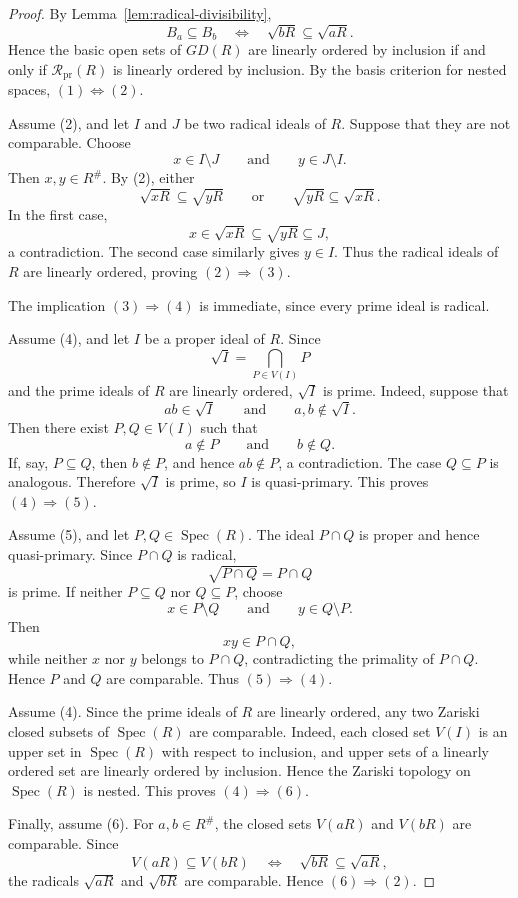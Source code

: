 \documentclass[11pt]{amsart}
\theoremstyle{plain}
\theoremstyle{definition}
\theoremstyle{remark}
\numberwithin{equation}{section}
\begin{document}
\begin{proof}
	By Lemma~\ref{lem:radical-divisibility},
	\[
	B_a\subseteq B_b
	\quad\Longleftrightarrow\quad
	\sqrt{bR}\subseteq\sqrt{aR}.
	\]
	Hence the basic open sets of $GD(R)$ are linearly ordered by inclusion
	if and only if $\mathcal R_{\mathrm{pr}}(R)$ is linearly ordered by
	inclusion. By the basis criterion for nested spaces,
	$(1)\Leftrightarrow(2)$.
	
	Assume (2), and let $I$ and $J$ be two radical ideals of $R$.
	Suppose that they are not comparable. Choose
	\[
	x\in I\setminus J
	\qquad\text{and}\qquad
	y\in J\setminus I.
	\]
	Then $x,y\in R^\#$. By (2), either
	\[
	\sqrt{xR}\subseteq\sqrt{yR}
	\qquad\text{or}\qquad
	\sqrt{yR}\subseteq\sqrt{xR}.
	\]
	In the first case,
	\[
	x\in\sqrt{xR}\subseteq\sqrt{yR}\subseteq J,
	\]
	a contradiction. The second case similarly gives $y\in I$.
	Thus the radical ideals of $R$ are linearly ordered, proving
	$(2)\Rightarrow(3)$.
	
	The implication $(3)\Rightarrow(4)$ is immediate, since every prime
	ideal is radical.
	
	Assume (4), and let $I$ be a proper ideal of $R$. Since
	\[
	\sqrt{I}
	=
	\bigcap_{P\in V(I)}P
	\]
	and the prime ideals of $R$ are linearly ordered, $\sqrt{I}$ is prime.
	Indeed, suppose that
	\[
	ab\in\sqrt{I}
	\qquad\text{and}\qquad
	a,b\notin\sqrt{I}.
	\]
	Then there exist $P,Q\in V(I)$ such that
	\[
	a\notin P
	\qquad\text{and}\qquad
	b\notin Q.
	\]
	If, say, $P\subseteq Q$, then $b\notin P$, and hence
	$ab\notin P$, a contradiction. The case $Q\subseteq P$ is analogous.
	Therefore $\sqrt{I}$ is prime, so $I$ is quasi-primary. This proves
	$(4)\Rightarrow(5)$.
	
	Assume (5), and let $P,Q\in\operatorname{Spec}(R)$. The ideal
	$P\cap Q$ is proper and hence quasi-primary. Since $P\cap Q$ is
	radical,
	\[
	\sqrt{P\cap Q}=P\cap Q
	\]
	is prime. If neither $P\subseteq Q$ nor $Q\subseteq P$, choose
	\[
	x\in P\setminus Q
	\qquad\text{and}\qquad
	y\in Q\setminus P.
	\]
	Then
	\[
	xy\in P\cap Q,
	\]
	while neither $x$ nor $y$ belongs to $P\cap Q$, contradicting the
	primality of $P\cap Q$. Hence $P$ and $Q$ are comparable. Thus
	$(5)\Rightarrow(4)$.
	
	Assume (4). Since the prime ideals of $R$ are linearly ordered, any
	two Zariski closed subsets of $\operatorname{Spec}(R)$ are comparable.
	Indeed, each closed set $V(I)$ is an upper set in
	$\operatorname{Spec}(R)$ with respect to inclusion, and upper sets of
	a linearly ordered set are linearly ordered by inclusion. Hence the
	Zariski topology on $\operatorname{Spec}(R)$ is nested. This proves
	$(4)\Rightarrow(6)$.
	
	Finally, assume (6). For $a,b\in R^\#$, the closed sets
	$V(aR)$ and $V(bR)$ are comparable. Since
	\[
	V(aR)\subseteq V(bR)
	\quad\Longleftrightarrow\quad
	\sqrt{bR}\subseteq\sqrt{aR},
	\]
	the radicals $\sqrt{aR}$ and $\sqrt{bR}$ are comparable. Hence
	$(6)\Rightarrow(2)$.
\end{proof}
\end{document}
